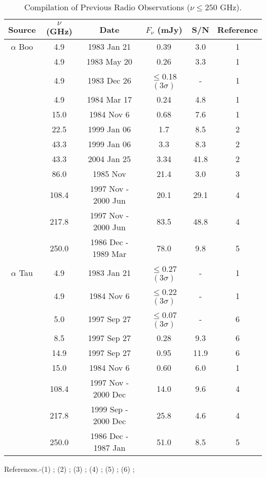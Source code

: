 \begin{table}[!hbt]
\begin{center}
\caption[Compilation of Previous Radio Observations ($\nu \le 250$ GHz).]
{Compilation of Previous Radio Observations ($\nu \le 250$ GHz).}
\begin{tabular}{cccccc}
\hline
\hline
\rule{0pt}{2.5ex}Source & $\nu$ (GHz) & Date &  $F_{\nu}$ (mJy) & S/N & Reference\\
\hline
$\alpha$ Boo &4.9  & 1983 Jan 21 & 0.39 & 3.0 & 1 \\
&4.9  & 1983 May 20 & 0.26 & 3.3& 1 \\
&4.9  & 1983 Dec 26 & $\le$0.18$(3\sigma)$&- & 1 \\
&4.9  & 1984 Mar 17 & 0.24  & 4.8& 1 \\
&15.0 & 1984 Nov 6 & 0.68 & 7.6& 1 \\
&22.5  & 1999 Jan 06  &1.7& 8.5& 2 \\
&43.3  & 1999 Jan 06 & 3.3& 8.3& 2 \\
&43.3  & 2004 Jan 25 & 3.34& 41.8& 2 \\
&86.0  & 1985 Nov  & 21.4& 3.0& 3 \\
&108.4  & 1997 Nov - 2000 Jun & 20.1 &29.1 & 4 \\
&217.8 & 1997 Nov - 2000 Jun  & 83.5 &48.8 & 4 \\
&250.0  & 1986 Dec - 1989 Mar  & 78.0 & 9.8& 5 \\
\hline
\rule{0pt}{3ex}    $\alpha$ Tau	&4.9  & 1983 Jan 21 & $\le$0.27$(3\sigma)$&-& 1 \\
&4.9  & 1984 Nov 6 & $\le$0.22$(3\sigma)$&-& 1 \\
&5.0  & 1997 Sep 27 & $\le$0.07$(3\sigma)$	&-& 6 \\
&8.5  & 1997 Sep 27 & 0.28 	&9.3	& 6 \\
&14.9 & 1997 Sep 27 & 0.95 	&11.9	& 6 \\
&15.0 & 1984 Nov 6 & 0.60 	&6.0	& 1 \\
&108.4  & 1997 Nov - 2000 Dec &  14.0  & 9.6& 4 \\
&217.8 & 1999 Sep - 2000 Dec  & 25.8 & 4.6& 4 \\
&250.0  & 1986 Dec - 1987 Jan & 51.0 & 8.5& 5 \\
\hline
\end{tabular}
\label{tab:6.4.1}
\begin{minipage}{13.5cm}
\rule{0pt}{3ex} References.-(1) \cite{drake_1986}; (2) \cite{dehaes_2011}; (3) \cite{altenhoff_1986}; (4) \cite{cohen_2005}; (5) \cite{altenhoff_1994}; (6) \cite{wood_2007}; 
\end{minipage}
\end{center}
\end{table}

